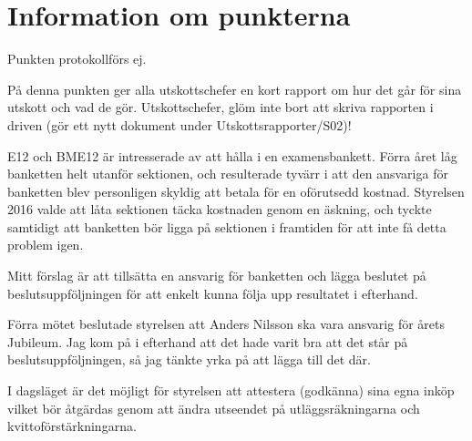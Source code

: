 \documentclass[10pt]{article}
\def\doctype{Handlingar} %
\def\mname{styrelsemöte} %
\def\mnum{S03/17} %
\begin{document}
\heading{{\doctype} till {\mname} {\mnum}}

\section*{Information om punkterna}

\begin{paragrafer}

\begin{paragrafer}
Punkten protokollförs ej.

På denna punkten ger alla utskottschefer en kort rapport om hur det går för sina utskott och vad de gör. Utskottschefer, glöm inte bort att skriva rapporten i driven (gör ett nytt dokument under Utskottsrapporter/S02)!

\end{paragrafer}

E12 och BME12 är intresserade av att hålla i en examensbankett. Förra året låg banketten helt utanför sektionen, och resulterade tyvärr i att den ansvariga för banketten blev personligen skyldig att betala för en oförutsedd kostnad. Styrelsen 2016 valde att låta sektionen täcka kostnaden genom en äskning, och tyckte samtidigt att banketten bör ligga på sektionen i framtiden för att inte få detta problem igen.

Mitt förslag är att tillsätta en ansvarig för banketten och lägga beslutet på beslutsuppföljningen för att enkelt kunna följa upp resultatet i efterhand.


Förra mötet beslutade styrelsen att Anders Nilsson ska vara ansvarig för årets Jubileum. Jag kom på i efterhand att det hade varit bra att det står på beslutsuppföljningen, så jag tänkte yrka på att lägga till det där.




I dagsläget är det möjligt för styrelsen att attestera (godkänna) sina egna inköp vilket bör åtgärdas genom att ändra utseendet på utläggsräkningarna och kvittoförstärkningarna.



\end{paragrafer}
\end{document}
